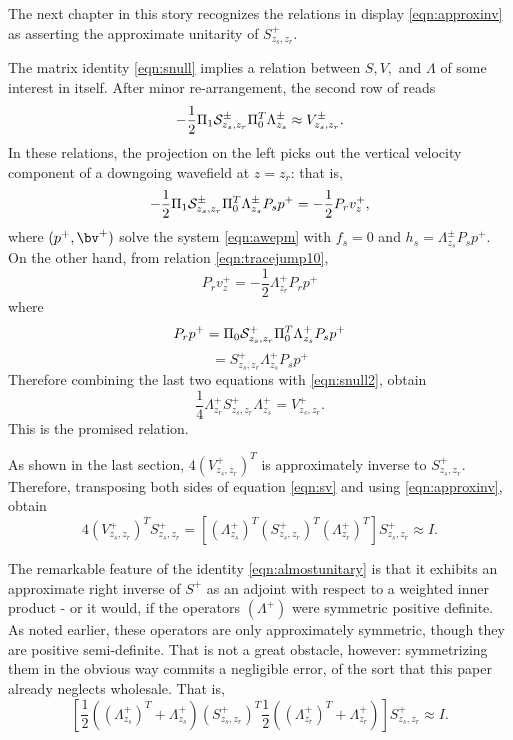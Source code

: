 The next chapter in this story recognizes the relations in display
\ref{eqn:approxinv} as asserting the approximate unitarity of
$S^+_{z_s,z_r}$.

The matrix identity \ref{eqn:snull} implies a relation between $S, V,$
and $\Lambda$ of some interest in itself. After minor re-arrangement, the second row of reads
\begin{equation}
  \label{eqn:snull2}
-\frac{1}{2}\Pi_1{\cal S}^{\pm}_{z_s,z_r}\Pi_0^T\Lambda^{\pm}_{z_s}  \approx
V^{\pm}_{z_s,z_r}.
\end{equation}
In these relations, the projection on the left picks out the vertical velocity component
of a downgoing wavefield at $z=z_r$: that is,
\[
-\frac{1}{2}\Pi_1{\cal S}^{\pm}_{z_s,z_r}\Pi_0^T\Lambda^{\pm}_{z_s}P_sp^+
=-\frac{1}{2}P_r v_z^+,
\]
where $(p^+, \bv^+)$ solve the system \ref{eqn:awepm} with $f_s=0$ and
$h_s = \Lambda^{\pm}_{z_s}P_sp^+$. On the other hand, from relation
\ref{eqn:tracejump10},
\[
  P_r v_z^+ = -\frac{1}{2}\Lambda^+_{z_r}P_r p^+
\]
where
\[
  P_r p^+ = \Pi_0{\cal S}^{+}_{z_s,z_r}\Pi_0^T\Lambda^{+}_{z_s}P_s
  p^+
\]
\[
  = S^+_{z_s,z_r}\Lambda^{+}_{z_s}P_sp^+
\]
Therefore combining the last two equations with \ref{eqn:snull2},
obtain
\begin{equation}
  \label{eqn:sv}
  \frac{1}{4}\Lambda^+_{z_r}S^+_{z_s,z_r}\Lambda^{+}_{z_s} = V^+_{z_s,z_r}.
\end{equation}
This is the promised relation.


As shown in the last section, $4(V_{z_s,z_r}^+)^T$ is approximately
inverse to $S^{+}_{z_s,z_r}$. Therefore, transposing both sides of
equation \ref{eqn:sv} and using \ref{eqn:approxinv}, obtain
\begin{equation}
  \label{eqn:almostunitary}
  4(V_{z_s,z_r}^+)^TS^+_{z_s,z_r} = [ (\Lambda^+_{z_s})^T
  (S^{+}_{z_s,z_r})^T(\Lambda^+_{z_r})^T]S^{+}_{z_s,z_r} \approx I.
\end{equation}

The remarkable feature of the identity \ref{eqn:almostunitary} is that
it exhibits an approximate right inverse of $S^+$ as an adjoint with
respect to a weighted inner product - or it would, if the operators
$(\Lambda^+)$ were symmetric positive definite. As noted earlier,
these operators are only approximately symmetric, though they are
positive semi-definite. That is not a great obstacle, however:
symmetrizing them in the obvious way commits a negligible error, of
the sort that this paper already neglects wholesale. That is,
\begin{equation}
  \label{eqn:unitary}
  [ \frac{1}{2}((\Lambda^+_{z_s})^T+ \Lambda^+_{z_s})
  (S^{+}_{z_s,z_r})^T \frac{1}{2}((\Lambda^+_{z_r})^T+
  \Lambda^+_{z_r})]S^{+}_{z_s,z_r} \approx I.
\end{equation}


